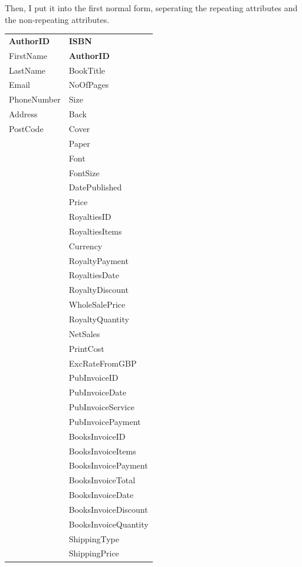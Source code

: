\newpage
Then, I put it into the first normal form, seperating the repeating attributes and the non-repeating attributes.

\begin{tabular}{|p{2.5cm}|p{3.5cm}|}
    \hline
    \textbf{AuthorID} & \textbf{ISBN} \\
    FirstName & \textbf{AuthorID} \\
    LastName & BookTitle \\
    Email & NoOfPages \\
    PhoneNumber & Size \\
    Address & Back \\
    PostCode & Cover \\
    & Paper \\
    & Font \\
    & FontSize \\
    & DatePublished\\
    & Price \\
    & RoyaltiesID \\
    & RoyaltiesItems \\
    & Currency \\
    & RoyaltyPayment \\
    & RoyaltiesDate \\
    & RoyaltyDiscount \\
    & WholeSalePrice \\
    & RoyaltyQuantity \\
    & NetSales \\
    & PrintCost \\
    & ExcRateFromGBP \\
    & PubInvoiceID \\
    & PubInvoiceDate \\
    & PubInvoiceService \\
    & PubInvoicePayment \\
    & BooksInvoiceID \\
    & BooksInvoiceItems \\
    & BooksInvoicePayment \\
    & BooksInvoiceTotal \\
    & BooksInvoiceDate \\
    & BooksInvoiceDiscount \\
    & BooksInvoiceQuantity \\
    & ShippingType \\
    & ShippingPrice \\
    \hline
\end{tabular}

